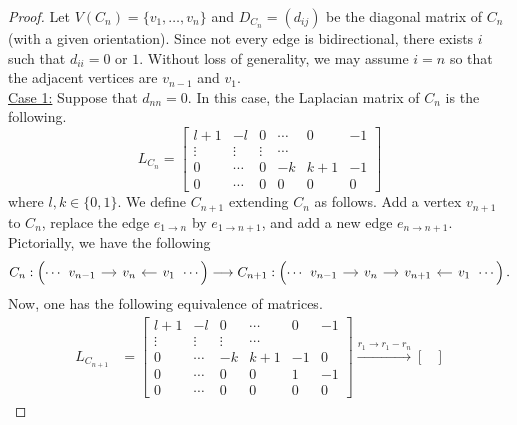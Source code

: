 \documentclass[11pt,reqno]{amsart}
\theoremstyle{definition}
\theoremstyle{plain}
\begin{document}
\begin{proof}
Let $V(C_n)=\{v_1,\dots,v_n\}$ and $D_{C_n} = (d_{ij})$ be the diagonal matrix of $C_n$ (with a given orientation). Since not every edge is bidirectional, there exists $i$ such that $d_{ii} = 0$ or $1$. Without loss of generality, we may assume $i = n$ so that the adjacent vertices are $v_{n-1}$ and $v_1$. \\

\noindent \underline{Case 1:} Suppose that $d_{nn} = 0$. In this case, the Laplacian matrix of $C_n$ is the following. 
\begin{equation}
			L_{C_n} = 
			\begin{bmatrix}
				l + 1 & -l & 0 & \cdots & 0 & -1 \\
				\vdots & \vdots & \vdots & \cdots \\
				0 & \cdots & 0 & -k & k+1 & -1 \\
				0 & \cdots & 0 & 0 & 0 & 0 
			\end{bmatrix}
\end{equation}
			where $l, k \in \{ 0, 1 \}$. 
			We define $C_{n+1}$ extending $C_n$ as follows. 
			Add a vertex $v_{n+1}$ to $C_n$, replace the edge $e_{1\to n}$ by $e_{1 \to n+1}$, and add a new edge $e_{n \to n+1}$. 
			Pictorially, we have the following
			\begin{equation} \label{obj1}
				C_n: \left( \cdots \begin{tikzcd}[column sep=0.4cm]
					v_{n-1} \arrow[r] & v_n & v_1 \arrow[l] 
				\end{tikzcd} \cdots \right)
				\longrightarrow
				C_{n+1}: \left( \cdots \begin{tikzcd}[column sep=0.4cm]
					v_{n-1} \arrow[r] & v_n \arrow[r] & v_{n+1} &  v_1 \arrow[l] 
				\end{tikzcd} \cdots \right).
			\end{equation}
Now, one has the following equivalence of matrices.
			\begin{align}
			L_{C_{n+1}} &= 
			\begin{bmatrix} 
				l + 1 & -l & 0 & \cdots & 0 & -1 \\
				\vdots & \vdots & \vdots & \cdots \\
				0 & \cdots & -k & k+1 & -1 &0 \\
				0 & \cdots & 0 & 0 & 1 & -1 \\
				0 & \cdots & 0 & 0 & 0 & 0 
			\end{bmatrix} 
			\stackrel{r_{1} \to r_1 - r_{n}}\longrightarrow
			\begin{bmatrix} 

\end{bmatrix}
\end{align}
\end{proof}
\end{document}
